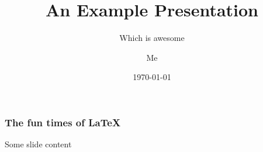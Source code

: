 \documentclass[xcolor={table}]{beamer}
\title{An Example Presentation}
\subtitle{Which is awesome}
\author{Me}
\date{\today}
\begin{document}
\begin{frame}
\maketitle
\end{frame}

\begin{frame}
  \frametitle{The fun times of \LaTeX}

  Some slide content

\end{frame}
\end{document}
